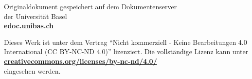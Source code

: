 \begin{otherlanguage}{ngerman}
\begin{center}
\ifedoc
\bigskip \bigskip

Originaldokument gespeichert auf dem Dokumentenserver \\ der Universität Basel
\\[0.5ex] \href{https://edoc.unibas.ch/}{\textbf{edoc.unibas.ch}}
\fi

\ifcclicense
\bigskip \bigskip

\href{https://creativecommons.org/licenses/by-nc-nd/4.0/deed.de}{
\Large \ccbyncnd
}
\medskip

{\footnotesize
Dieses Werk ist unter dem Vertrag ``Nicht kommerziell - Keine Bearbeitungen 4.0 International (CC BY-NC-ND 4.0)'' lizenziert. Die vollständige Lizenz kann unter \\[0.5ex]
\href{https://creativecommons.org/licenses/by-nc-nd/4.0/deed.de}{\textbf{creativecommons.org/licenses/by-nc-nd/4.0/}} \\[0.5ex]
eingesehen werden.
}
\fi

\end{center}

\end{otherlanguage}
\clearpage
